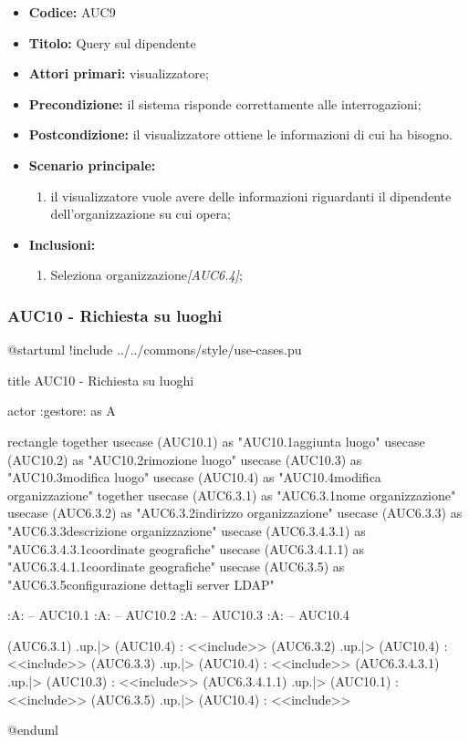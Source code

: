 \documentclass[casi-duso]{subfiles}
\begin{document}
\begin{itemize}
  \item \textbf{Codice:} AUC9
  \item \textbf{Titolo:} Query sul dipendente
  \item \textbf{Attori primari:} visualizzatore;
  \item \textbf{Precondizione:} il sistema risponde correttamente alle interrogazioni;
  \item \textbf{Postcondizione:} il visualizzatore ottiene le informazioni di cui ha bisogno.
  \item \textbf{Scenario principale:}
  \begin{enumerate}
    \item il visualizzatore vuole avere delle informazioni riguardanti il dipendente dell'organizzazione su cui opera;
  \end{enumerate}
  \item \textbf{Inclusioni:}
  \begin{enumerate}
    \item Seleziona organizzazione\emph{[AUC6.4]};
  \end{enumerate}
\end{itemize}

\subsubsection{AUC10 - Richiesta su luoghi}%
\label{subsub:AUC10}

\begin{plantuml}
@startuml 
!include ../../commons/style/use-cases.pu

title AUC10 - Richiesta su luoghi

actor :gestore: as A

rectangle {
  together {
    usecase (AUC10.1) as "AUC10.1\nRichiesta aggiunta luogo"
    usecase (AUC10.2) as "AUC10.2\nRichiesta rimozione luogo"
    usecase (AUC10.3) as "AUC10.3\nRichiesta modifica luogo"
    usecase (AUC10.4) as "AUC10.4\nRichiesta modifica organizzazione"
  }
  together {
    usecase (AUC6.3.1) as "AUC6.3.1\nModifica nome organizzazione"
    usecase (AUC6.3.2) as "AUC6.3.2\nModifica indirizzo organizzazione"
    usecase (AUC6.3.3) as "AUC6.3.3\nModifica descrizione organizzazione"
    usecase (AUC6.3.4.3.1) as "AUC6.3.4.3.1\nModifica coordinate geografiche"
    usecase (AUC6.3.4.1.1) as "AUC6.3.4.1.1\nInserisci coordinate geografiche"
    usecase (AUC6.3.5) as "AUC6.3.5\nModifica configurazione dettagli server LDAP"
  }
}

:A: -- AUC10.1
:A: -- AUC10.2
:A: -- AUC10.3
:A: -- AUC10.4


(AUC6.3.1) .up.|> (AUC10.4) : <<include>>
(AUC6.3.2) .up.|> (AUC10.4) : <<include>>
(AUC6.3.3) .up.|> (AUC10.4) : <<include>>
(AUC6.3.4.3.1) .up.|> (AUC10.3) : <<include>>
(AUC6.3.4.1.1) .up.|> (AUC10.1) : <<include>>
(AUC6.3.5) .up.|> (AUC10.4) : <<include>>

@enduml
\end{plantuml}
\end{document}
